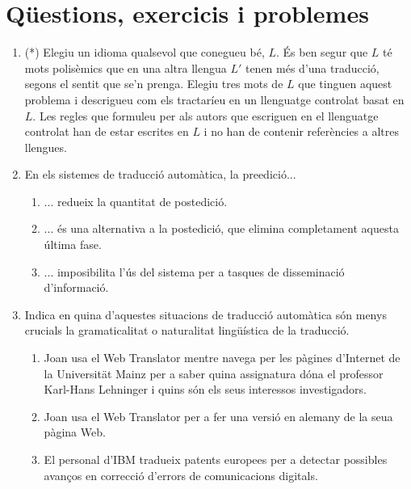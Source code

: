 \section{Qüestions, exercicis i problemes}
\begin{enumerate}
\item(*) Elegiu un idioma qualsevol que conegueu bé, $L$. És ben segur
  que $L$ té mots polisèmics que en una altra llengua $L'$ tenen més d'una
  traducció, segons el sentit que se'n prenga. Elegiu tres mots de $L$
  que tinguen aquest problema i descrigueu com els tractaríeu en un
  llenguatge controlat basat en $L$. Les regles que formuleu per als
  autors que escriguen en el llenguatge controlat han de estar
  escrites en $L$ i no han de contenir referències a altres llengues.

\item En els sistemes de traducció automàtica, la
preedició...
 \begin{enumerate}
 \item ... redueix la quantitat de postedició.
 \item ... és una alternativa a la postedició, que elimina completament
 aquesta
 última fase.
 \item ... imposibilita l'ús del sistema per a tasques de
 disseminació d'informació.
 \end{enumerate}


\item Indica en quina d'aquestes situacions de traducció automàtica
      són menys crucials la gramaticalitat o naturalitat lingüística
      de la traducció.
        \begin{enumerate}
        \item Joan usa el Web Translator mentre navega 
              per les
              pàgines d'Internet de la Universit\"{a}t Mainz 
              per a saber quina assignatura
              dóna el  professor
              Karl-Hans Lehninger i quins són els seus interessos
              investigadors.
        \item Joan usa el Web Translator per a fer una versió en
              alemany de la seua pàgina Web.
        \item El personal d'IBM tradueix patents europees
               per a
              detectar possibles avanços
              en correcció d'errors de comunicacions digitals.

        \end{enumerate}


\end{enumerate}

